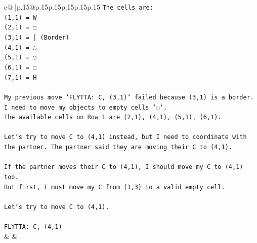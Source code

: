 \documentclass{article}
\begin{document}
{\begin{supertabular}{c@{$\;$}|p{.15\linewidth}@{}p{.15\linewidth}p{.15\linewidth}p{.15\linewidth}p{.15\linewidth}p{.15\linewidth}}
{{{\texttt{The cells are:} \\
\texttt{(1,1) = W} \\
\texttt{(2,1) = ◌} \\
\texttt{(3,1) = │ (Border)} \\
\texttt{(4,1) = ◌} \\
\texttt{(5,1) = ◌} \\
\texttt{(6,1) = ◌} \\
\texttt{(7,1) = H} \\
\\ 
\texttt{My previous move `FLYTTA: C, (3,1)` failed because (3,1) is a border.} \\
\texttt{I need to move my objects to empty cells `◌`.} \\
\texttt{The available cells on Row 1 are (2,1), (4,1), (5,1), (6,1).} \\
\\ 
\texttt{Let's try to move C to (4,1) instead, but I need to coordinate with the partner. The partner said they are moving their C to (4,1).} \\
\\ 
\texttt{If the partner moves their C to (4,1), I should move my C to (4,1) too.} \\
\texttt{But first, I must move my C from (1,3) to a valid empty cell.} \\
\\ 
\texttt{Let's try to move C to (4,1).} \\
\\ 
\texttt{FLYTTA: C, (4,1)} \\
            }
        }
    }
    & & \\ \\


\end{supertabular}}
\end{document}
